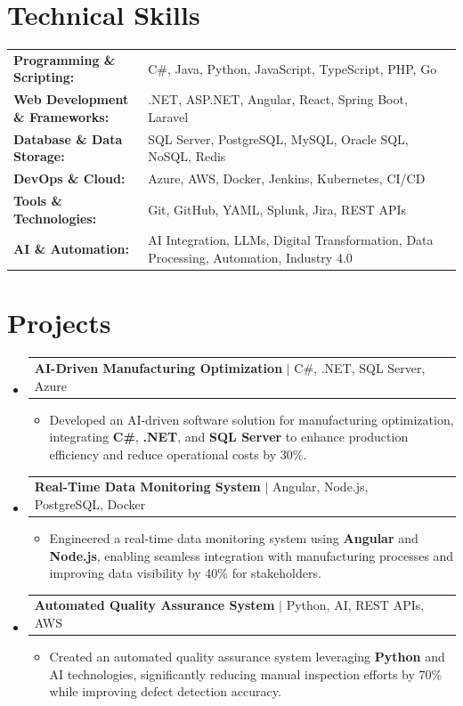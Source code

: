 \documentclass[letterpaper,10pt]{article}
\makeatletter
\newcommand{\resumeItem}[1]{
  \item{\fontsize{8pt}{9pt}\selectfont
    #1 \vspace{-3pt}
  }
}
\newcommand{\resumeProjectHeading}[2]{
    \item
    \begin{tabular*}{1.001\textwidth}{l@{\extracolsep{\fill}}r}
      \fontsize{8.5pt}{10pt}#1 & \textbf{\fontsize{8.5pt}{10pt} #2}\\
    \end{tabular*}\vspace{-7pt}
}
\newcommand{\resumeSubHeadingListStart}{\begin{itemize}[leftmargin=0pt, label={}]}
\newcommand{\resumeSubHeadingListEnd}{\end{itemize}}
\newcommand{\resumeItemListStart}{\begin{itemize}[leftmargin=*]}
\newcommand{\resumeItemListEnd}{\end{itemize}\vspace{-5pt}}
\makeatother
\begin{document}
\section{Technical Skills}
        \vspace{-14pt}
        \begin{table}[h]
            \fontsize{8pt}{9pt}\selectfont
            \begin{tabular}{p{0.3\linewidth} p{0.7\linewidth}}
                \textbf{Programming \& Scripting:} & C\#, Java, Python, JavaScript, TypeScript, PHP, Go \\
                \textbf{Web Development \& Frameworks:} & .NET, ASP.NET, Angular, React, Spring Boot, Laravel \\
                \textbf{Database \& Data Storage:} & SQL Server, PostgreSQL, MySQL, Oracle SQL, NoSQL, Redis \\
                \textbf{DevOps \& Cloud:} & Azure, AWS, Docker, Jenkins, Kubernetes, CI/CD \\
                \textbf{Tools \& Technologies:} & Git, GitHub, YAML, Splunk, Jira, REST APIs \\
                \textbf{AI \& Automation:} & AI Integration, LLMs, Digital Transformation, Data Processing, Automation, Industry 4.0 \\
            \end{tabular}
        \end{table}
 \vspace{-18pt}

\section{Projects}
    \vspace{-5pt}
    \resumeSubHeadingListStart
          \resumeProjectHeading
            {\textbf{AI-Driven Manufacturing Optimization} $|$ C#, .NET, SQL Server, Azure}{}
            \resumeItemListStart
                \resumeItem{Developed an AI-driven software solution for manufacturing optimization, integrating \textbf{C#}, \textbf{.NET}, and \textbf{SQL Server} to enhance production efficiency and reduce operational costs by 30\%.}
            \resumeItemListEnd
        \vspace{-12pt}
    
        \resumeProjectHeading
            {\textbf{Real-Time Data Monitoring System} $|$ Angular, Node.js, PostgreSQL, Docker}{}
        \resumeItemListStart
                \resumeItem{Engineered a real-time data monitoring system using \textbf{Angular} and \textbf{Node.js}, enabling seamless integration with manufacturing processes and improving data visibility by 40\% for stakeholders.}
        \resumeItemListEnd
      \vspace{-12pt}
      \resumeProjectHeading
        {\textbf{Automated Quality Assurance System} $|$ Python, AI, REST APIs, AWS}{}
    \resumeItemListStart
            \resumeItem{Created an automated quality assurance system leveraging \textbf{Python} and AI technologies, significantly reducing manual inspection efforts by 70\% while improving defect detection accuracy.}
    \resumeItemListEnd
    \resumeSubHeadingListEnd
\end{document}
